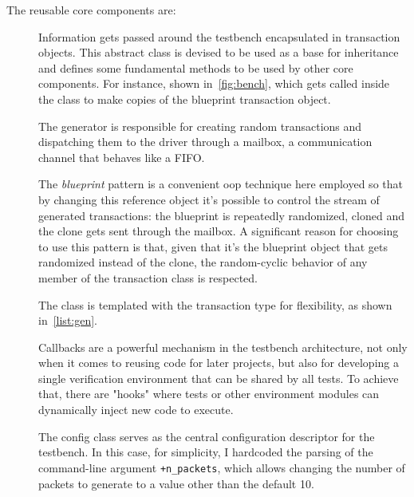 \noindent The reusable core components are:
\begin{description}
    \item[] Information gets passed around the testbench encapsulated in transaction objects. This abstract class is devised to be used as a base for inheritance and defines some fundamental methods to be used by other core components. For instance,  shown in~\cref{fig:bench}, which gets called inside the  class to make copies of the blueprint transaction object.
    
    \item[] The generator is responsible for creating random transactions and dispatching them to the driver through a mailbox, a communication channel that behaves like a FIFO. 
    
    The \emph{blueprint} pattern is a convenient \ac{oop} technique here employed so that by changing this reference object it's possible to control the stream of generated transactions: the blueprint is repeatedly randomized, cloned and the clone gets sent through the mailbox. A significant reason for choosing to use this pattern is that, given that it's the blueprint object that gets randomized instead of the clone, the random-cyclic behavior of any  member of the transaction class is respected.

    The class is templated with the transaction type for flexibility, as shown in~\cref{list:gen}.
    
    \item[] Callbacks are a powerful mechanism in the testbench architecture, not only when it comes to reusing code for later projects, but also for developing a single verification environment that can be shared by all tests. To achieve that, there are "hooks" where tests or other environment modules can dynamically inject new code to execute.
    
    \item[] The config class serves as the central configuration descriptor for the testbench. In this case, for simplicity, I hardcoded the parsing of the command-line argument \texttt{+n_packets}, which allows changing the number of packets to generate to a value other than the default 10.
    

\end{description}
